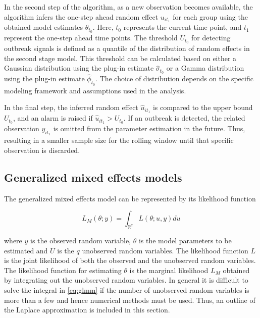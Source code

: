 \documentclass[preprint, 3p, authoryear]{elsarticle} %
\begin{document}
In the second step of the algorithm, as a new observation becomes available, the algorithm infers the one-step ahead random effect \(u_{it_1}\) for each group using the obtained model estimates \(\theta_{t_0}\). Here, \(t_0\) represents the current time point, and \(t_1\) represent the one-step ahead time points. The threshold \(U_{t_0}\) for detecting outbreak signals is defined as a quantile of the distribution of random effects in the second stage model. This threshold can be calculated based on either a Gaussian distribution using the plug-in estimate \(\hat{\sigma}_{t_0}\) or a Gamma distribution using the plug-in estimate \(\hat{\phi}_{t_0}\). The choice of distribution depends on the specific modeling framework and assumptions used in the analysis.

In the final step, the inferred random effect \(\hat{u}_{it_1}\) is compared to the upper bound \(U_{t_0}\), and an alarm is raised if \(\hat{u}_{it_1}>U_{t_0}\). If an outbreak is detected, the related observation \(y_{it_1}\) is omitted from the parameter estimation in the future. Thus, resulting in a smaller sample size for the rolling window until that specific observation is discarded.

\hypertarget{generalized-mixed-effects-models}{%
\subsection{\texorpdfstring{Generalized mixed effects models \label{glmm}}{Generalized mixed effects models }}\label{generalized-mixed-effects-models}}

The generalized mixed effects model can be represented by its likelihood function

\begin{equation}\label{eq:glmm}
  L_{M}(\theta; y)=\int_{\mathbb{R}^{q}} L(\theta;u,y) du
\end{equation}

where \(y\) is the observed random variable, \(\theta\) is the model parameters to be estimated and \(U\) is the \(q\) unobserved random variables. The likelihood function \(L\) is the joint likelihood of both the observed and the unobserved random variables. The likelihood function for estimating \(\theta\) is the marginal likelihood \(L_{M}\) obtained by integrating out the unobserved random variables. In general it is difficult to solve the integral in \eqref{eq:glmm} if the number of unobserved random variables is more than a few and hence numerical methods must be used. Thus, an outline of the Laplace approximation is included in this section.
\end{document}
